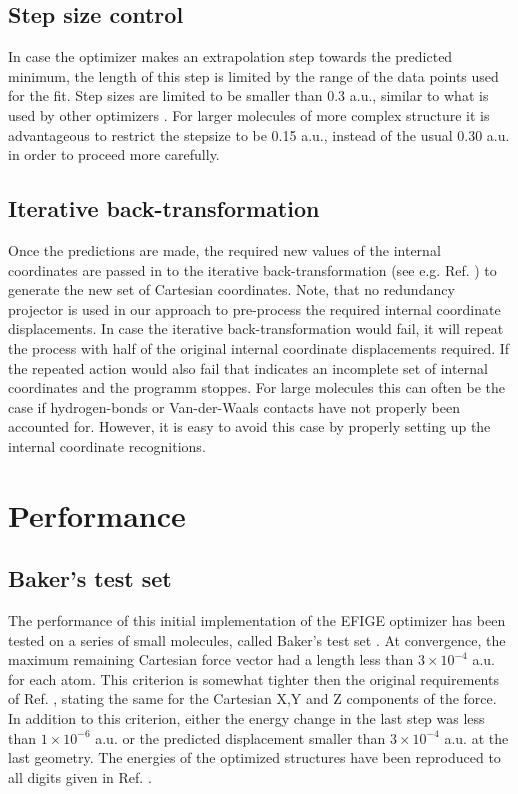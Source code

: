 \documentclass[prl,aps,twocolumn,showpacs,twocolumngrid,superbib]{revtex4}
\begin{document}
\subsection{Step size control}
In case the optimizer makes an extrapolation step towards the predicted
minimum, the length of this step is limited by the range of the
data points used for the fit. Step sizes are limited to be smaller
than 0.3 a.u., similar to what is used by other optimizers 
\cite{eckert}.
For larger molecules of more complex structure 
it is advantageous to restrict
the stepsize to be 0.15 a.u., instead of the usual 0.30 a.u. 
in order to proceed more carefully.

\subsection{Iterative back-transformation}
Once the predictions are made, the required new values of the internal
coordinates are passed in to the iterative back-transformation
(see e.g. Ref. \cite{nemeth_coordtrf1})
to generate the new set of Cartesian coordinates. Note, that no
redundancy projector is used in our approach to pre-process the
required internal coordinate displacements. In case the iterative 
back-transformation would fail, it will repeat the process with 
half of the original
internal coordinate displacements required. If the repeated action 
would also fail that indicates an incomplete set of internal coordinates
and the programm stoppes. For large molecules this can often be the case
if hydrogen-bonds or Van-der-Waals contacts have not properly been 
accounted for. However, it is easy to avoid this case by properly 
setting up the internal coordinate recognitions.

\section{Performance}
\subsection{Baker's test set}
The performance of this initial implementation of the EFIGE optimizer
has been tested on a 
series of small molecules, called Baker's test set \cite{bakerstest}.
At convergence, the maximum remaining Cartesian
force vector had a length less than $3\times10^{-4}$ a.u. for each
atom. This criterion is somewhat tighter then the original requirements
of Ref. \cite{bakerstest}, stating the same for the Cartesian X,Y and Z
components of the force. 
In addition to this criterion, either the energy change in the last step
was less than $1\times10^{-6}$ a.u. or the predicted displacement
smaller than $3\times10^{-4}$ a.u. at the last geometry.
The energies of the optimized
structures have been reproduced to all digits given in 
Ref. \cite{bakerstest}.
\end{document}
